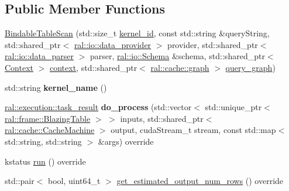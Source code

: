 \subsection*{Public Member Functions}
\begin{DoxyCompactItemize}
\item 
\hyperlink{classral_1_1batch_1_1BindableTableScan_adc92c38cd526bfbf6b1586fbfa4058cc}{Bindable\+Table\+Scan} (std\+::size\+\_\+t \hyperlink{classral_1_1cache_1_1kernel_a2fd708656cb056a41ec635b8bdc4acfe}{kernel\+\_\+id}, const std\+::string \&query\+String, std\+::shared\+\_\+ptr$<$ \hyperlink{classral_1_1io_1_1data__provider}{ral\+::io\+::data\+\_\+provider} $>$ provider, std\+::shared\+\_\+ptr$<$ \hyperlink{classral_1_1io_1_1data__parser}{ral\+::io\+::data\+\_\+parser} $>$ parser, \hyperlink{classral_1_1io_1_1Schema}{ral\+::io\+::\+Schema} \&schema, std\+::shared\+\_\+ptr$<$ \hyperlink{classblazingdb_1_1manager_1_1Context}{Context} $>$ \hyperlink{classral_1_1cache_1_1kernel_af0347d14d678cfa7205c1387746a2e1b}{context}, std\+::shared\+\_\+ptr$<$ \hyperlink{classral_1_1cache_1_1graph}{ral\+::cache\+::graph} $>$ \hyperlink{classral_1_1cache_1_1kernel_a5fbb02292aff165a28ef25e75f0d89bd}{query\+\_\+graph})
\item 
\mbox{\label{classral_1_1batch_1_1BindableTableScan_a0a83091e678279f9de802ec8856ca705}} 
std\+::string {\bfseries kernel\+\_\+name} ()
\item 
\mbox{\label{classral_1_1batch_1_1BindableTableScan_abe5282c1203677b2c02dde35f122416c}} 
\hyperlink{structral_1_1execution_1_1task__result}{ral\+::execution\+::task\+\_\+result} {\bfseries do\+\_\+process} (std\+::vector$<$ std\+::unique\+\_\+ptr$<$ \hyperlink{classral_1_1frame_1_1BlazingTable}{ral\+::frame\+::\+Blazing\+Table} $>$ $>$ inputs, std\+::shared\+\_\+ptr$<$ \hyperlink{classral_1_1cache_1_1CacheMachine}{ral\+::cache\+::\+Cache\+Machine} $>$ output, cuda\+Stream\+\_\+t stream, const std\+::map$<$ std\+::string, std\+::string $>$ \&args) override
\item 
kstatus \hyperlink{classral_1_1batch_1_1BindableTableScan_a3215b390c1b588e165724b108038cbf9}{run} () override
\item 
std\+::pair$<$ bool, uint64\+\_\+t $>$ \hyperlink{classral_1_1batch_1_1BindableTableScan_aa5054a845227c869fd27869e1784eb4d}{get\+\_\+estimated\+\_\+output\+\_\+num\+\_\+rows} () override
\end{DoxyCompactItemize}

